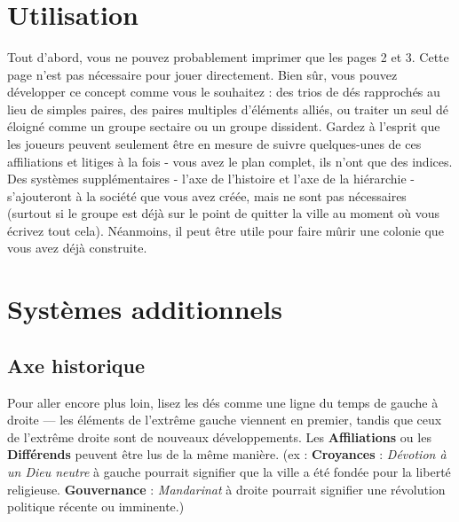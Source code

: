 \documentclass{article}
\begin{document}
\title{\vspace{-0.5cm}{\Huge One-Roll Sociétés} \vspace{-1cm}}

\date{}

\maketitle


\section*{Utilisation}
Tout d'abord, vous ne pouvez probablement imprimer que les pages 2 et 3. Cette page n'est pas nécessaire pour jouer directement.
Bien sûr, vous pouvez développer ce concept comme vous le souhaitez : des trios de dés rapprochés au lieu de simples paires, des paires multiples d'éléments alliés, ou traiter un seul dé éloigné comme un groupe sectaire ou un groupe dissident. Gardez à l'esprit que les joueurs peuvent seulement être en mesure de suivre quelques-unes de ces affiliations et litiges à la fois - vous avez le plan complet, ils n'ont que des indices. Des systèmes supplémentaires - l'axe de l'histoire et l'axe de la hiérarchie - s'ajouteront à la société que vous avez créée, mais ne sont pas nécessaires (surtout si le groupe est déjà sur le point de quitter la ville au moment où vous écrivez tout cela). Néanmoins, il peut être utile pour faire mûrir une colonie que vous avez déjà construite.


\section*{Systèmes additionnels}

\subsection*{Axe historique}
Pour aller encore plus loin, lisez les dés comme une ligne du temps de gauche à droite --- les éléments de l'extrême gauche viennent en premier, tandis que ceux de l'extrême droite sont de nouveaux développements. Les \textbf{Affiliations} ou les \textbf{Différends} peuvent être lus de la même manière. (ex : \textbf{Croyances} : \textit{Dévotion à un Dieu neutre} à gauche pourrait signifier que la ville a été fondée pour la liberté religieuse. \textbf{Gouvernance} : \textit{Mandarinat} à droite pourrait signifier une révolution politique récente ou imminente.)
\end{document}
